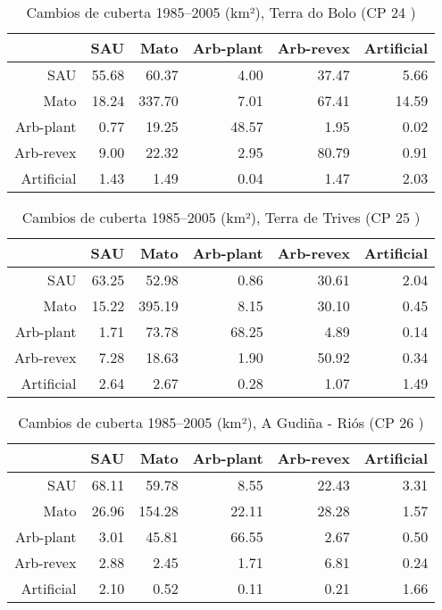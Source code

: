\begin{table}[p]
\centering
\caption{Cambios de cuberta 1985--2005 (km²), Terra do Bolo (CP 24 )} 
\label{TaboaContinxCP24}
\begin{tabular}{rrrrrr}
  \hline
 & SAU & Mato & Arb-plant & Arb-revex & Artificial \\ 
  \hline
SAU & 55.68 & 60.37 & 4.00 & 37.47 & 5.66 \\ 
  Mato & 18.24 & 337.70 & 7.01 & 67.41 & 14.59 \\ 
  Arb-plant & 0.77 & 19.25 & 48.57 & 1.95 & 0.02 \\ 
  Arb-revex & 9.00 & 22.32 & 2.95 & 80.79 & 0.91 \\ 
  Artificial & 1.43 & 1.49 & 0.04 & 1.47 & 2.03 \\ 
   \hline
\end{tabular}
\end{table}
\begin{table}[p]
\centering
\caption{Cambios de cuberta 1985--2005 (km²), Terra de Trives (CP 25 )} 
\label{TaboaContinxCP25}
\begin{tabular}{rrrrrr}
  \hline
 & SAU & Mato & Arb-plant & Arb-revex & Artificial \\ 
  \hline
SAU & 63.25 & 52.98 & 0.86 & 30.61 & 2.04 \\ 
  Mato & 15.22 & 395.19 & 8.15 & 30.10 & 0.45 \\ 
  Arb-plant & 1.71 & 73.78 & 68.25 & 4.89 & 0.14 \\ 
  Arb-revex & 7.28 & 18.63 & 1.90 & 50.92 & 0.34 \\ 
  Artificial & 2.64 & 2.67 & 0.28 & 1.07 & 1.49 \\ 
   \hline
\end{tabular}
\end{table}
\begin{table}[p]
\centering
\caption{Cambios de cuberta 1985--2005 (km²), A Gudiña - Riós (CP 26 )} 
\label{TaboaContinxCP26}
\begin{tabular}{rrrrrr}
  \hline
 & SAU & Mato & Arb-plant & Arb-revex & Artificial \\ 
  \hline
SAU & 68.11 & 59.78 & 8.55 & 22.43 & 3.31 \\ 
  Mato & 26.96 & 154.28 & 22.11 & 28.28 & 1.57 \\ 
  Arb-plant & 3.01 & 45.81 & 66.55 & 2.67 & 0.50 \\ 
  Arb-revex & 2.88 & 2.45 & 1.71 & 6.81 & 0.24 \\ 
  Artificial & 2.10 & 0.52 & 0.11 & 0.21 & 1.66 \\ 
   \hline
\end{tabular}
\end{table}
